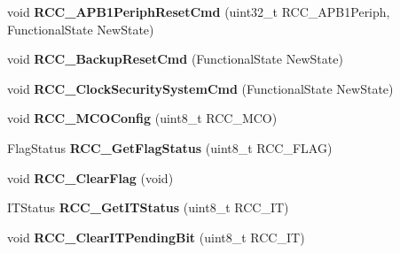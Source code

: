 \begin{DoxyCompactItemize}
\item 
\hypertarget{group__RCC__Exported__Functions_gab197ae4369c10b92640a733b40ed2801}{
void {\bfseries RCC\_\-APB1PeriphResetCmd} (uint32\_\-t RCC\_\-APB1Periph, FunctionalState NewState)}
\label{group__RCC__Exported__Functions_gab197ae4369c10b92640a733b40ed2801}

\item 
\hypertarget{group__RCC__Exported__Functions_ga636c3b72f35391e67f12a551b15fa54a}{
void {\bfseries RCC\_\-BackupResetCmd} (FunctionalState NewState)}
\label{group__RCC__Exported__Functions_ga636c3b72f35391e67f12a551b15fa54a}

\item 
\hypertarget{group__RCC__Exported__Functions_ga0ff1fd7b9a8a49cdda11b7d7261c3494}{
void {\bfseries RCC\_\-ClockSecuritySystemCmd} (FunctionalState NewState)}
\label{group__RCC__Exported__Functions_ga0ff1fd7b9a8a49cdda11b7d7261c3494}

\item 
\hypertarget{group__RCC__Exported__Functions_ga8f62b86c6ca8ae6585ba1cec79431fe5}{
void {\bfseries RCC\_\-MCOConfig} (uint8\_\-t RCC\_\-MCO)}
\label{group__RCC__Exported__Functions_ga8f62b86c6ca8ae6585ba1cec79431fe5}

\item 
\hypertarget{group__RCC__Exported__Functions_ga2897bdc52f272031c44fb1f72205d295}{
FlagStatus {\bfseries RCC\_\-GetFlagStatus} (uint8\_\-t RCC\_\-FLAG)}
\label{group__RCC__Exported__Functions_ga2897bdc52f272031c44fb1f72205d295}

\item 
\hypertarget{group__RCC__Exported__Functions_ga53f909dbb15a54124419084ebda97d72}{
void {\bfseries RCC\_\-ClearFlag} (void)}
\label{group__RCC__Exported__Functions_ga53f909dbb15a54124419084ebda97d72}

\item 
\hypertarget{group__RCC__Exported__Functions_ga6126c99f398ee4be410ad76ae3aee18f}{
ITStatus {\bfseries RCC\_\-GetITStatus} (uint8\_\-t RCC\_\-IT)}
\label{group__RCC__Exported__Functions_ga6126c99f398ee4be410ad76ae3aee18f}

\item 
\hypertarget{group__RCC__Exported__Functions_ga529842d165910f8f87e26115da36089b}{
void {\bfseries RCC\_\-ClearITPendingBit} (uint8\_\-t RCC\_\-IT)}
\label{group__RCC__Exported__Functions_ga529842d165910f8f87e26115da36089b}

\end{DoxyCompactItemize}
